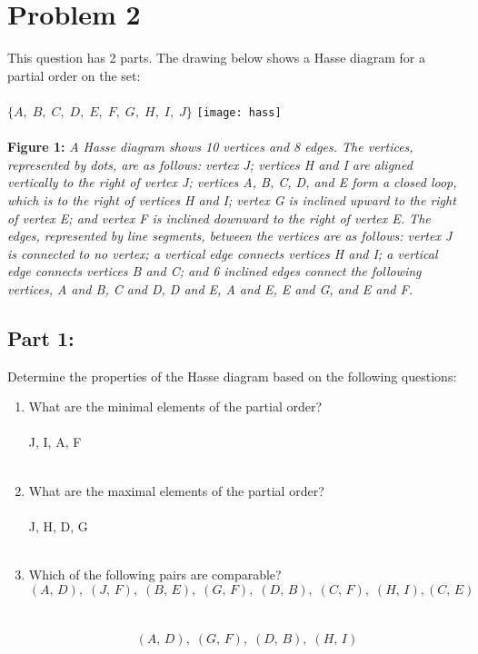 \documentclass{amsart}
\theoremstyle{definition}
\theoremstyle{Exercise}
\theoremstyle{remark}
\theoremstyle{rule}
\numberwithin{equation}{section}
\begin{document}
  \section*{Problem 2}
 This question has 2 parts.
 The drawing below shows a Hasse diagram for a partial order on the set:
 \\\\
   $\{A, \;B,\; C,\; D,\; E,\; F,\; G,\; H,\; I, \; J\}$
 \texttt{[image: hass]}
\\\\
 {\color{blue} {\bf Figure 1:} \emph{A Hasse diagram shows 10 vertices and 8 edges. The vertices, represented by dots, are as follows: vertex J; vertices H and I are aligned vertically to the right of vertex J; vertices A, B, C, D, and E form a closed loop, which is to the right of vertices H and I; vertex G is inclined upward to the right of vertex E; and vertex F is inclined downward to the right of vertex E. The edges, represented by line segments, between the vertices are as follows: vertex J is connected to no vertex; a vertical edge connects vertices H and I; a vertical edge connects vertices B and C; and 6 inclined edges connect the following vertices, A and B, C and D, D and E, A and E, E and G, and E and F.
  }
  }
  \\
 \subsection*{Part 1:}
 Determine the properties of the Hasse diagram based on the following questions:

  \begin{enumerate}[label=(\alph*)]
    \item What are the minimal elements of the partial order?
\\\\
  J, I, A, F
\\\\
    \item What are the maximal elements of the partial order?
\\\\
  J, H, D, G
\\\\
    \item Which of the following pairs are comparable?
\[(A,\, D),\; (J,\, F),\; (B,\, E),\; (G,\, F),\; (D,\, B),\; (C,\, F),\; (H,\, I), (C,\, E)\]
\\\\
  \[(A,\, D),\; (G,\, F),\; (D,\, B),\; (H,\, I)\]
\\\\
   \end{enumerate}
   \newpage
\end{document}
